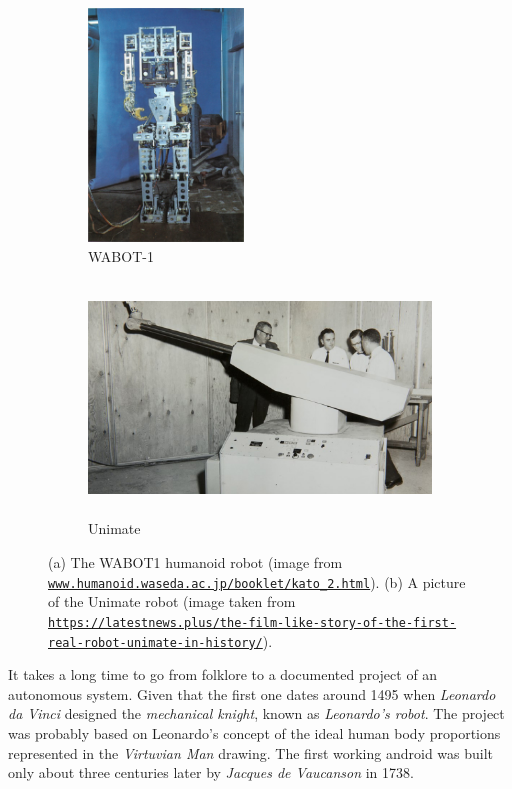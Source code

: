 \begin{figure}[t]
\centering
 \begin{subfigure}[b]{0.27\textwidth}
        \centering
        \includegraphics[height=6.2cm]{chapter_introduction/figures/WABOT-1.jpg}
        \caption{WABOT-1}
        \label{fig:wabot}
    \end{subfigure}
    \hfill
    \begin{subfigure}[b]{0.72\textwidth}
        \centering
        \includegraphics[height=6.2cm]{chapter_introduction/figures/unimate.jpeg}
        \caption{Unimate}
        \label{fig:unimate}
    \end{subfigure}
    \caption[WABOT-1 and Unimate]{ (a) The WABOT1 humanoid robot (image from \href{www.humanoid.waseda.ac.jp/booklet/kato\_2.html}{\texttt{www.humanoid.waseda.ac.jp/booklet/kato\_2.html}}).  (b) A picture of the Unimate robot (image taken from \href{https://latestnews.plus/the-film-like-story-of-the-first-real-robot-unimate-in-history/}{\texttt{https://latestnews.plus/the-film-like-story-of-the-first-real-robot-unimate-in-history/}}).}
\end{figure}
\par
It takes a long time to go from folklore to a documented project of an autonomous system. Given that the first one dates around 1495 when \emph{Leonardo da Vinci} designed the \emph{mechanical knight}, known as \emph{Leonardo's robot}. The project was probably based on Leonardo's concept of the ideal human body proportions represented in the \emph{Virtuvian Man} drawing. The first working android was built only about three centuries later by \emph{Jacques de Vaucanson} in 1738.
